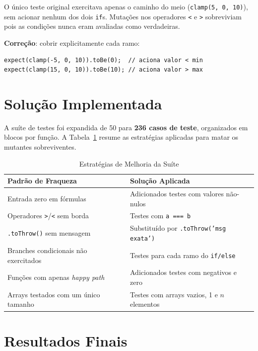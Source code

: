 \documentclass[conference]{IEEEtran}
\begin{document}
O único teste original exercitava apenas o caminho do meio (\texttt{clamp(5, 0, 10)}),
sem acionar nenhum dos dois \texttt{if}s. Mutações nos operadores \texttt{<} e
\texttt{>} sobreviviam pois as condições nunca eram avaliadas como verdadeiras.

\textbf{Correção}: cobrir explicitamente cada ramo:

\begin{lstlisting}[caption={Testes de ramo adicionados}]
expect(clamp(-5, 0, 10)).toBe(0);  // aciona valor < min
expect(clamp(15, 0, 10)).toBe(10); // aciona valor > max
\end{lstlisting}

\section{Solução Implementada}

A suíte de testes foi expandida de 50 para \textbf{236 casos de teste},
organizados em blocos por função. A Tabela~\ref{tab:estrategia} resume as
estratégias aplicadas para matar os mutantes sobreviventes.

\begin{table}[H]
\caption{Estratégias de Melhoria da Suíte}
\label{tab:estrategia}
\centering
\begin{tabularx}{\columnwidth}{lX}
\toprule
\textbf{Padrão de Fraqueza} & \textbf{Solução Aplicada} \\
\midrule
Entrada zero em fórmulas & Adicionados testes com valores não-nulos \\
Operadores \texttt{>}/\texttt{<} sem borda & Testes com \texttt{a === b} \\
\texttt{.toThrow()} sem mensagem & Substituído por \texttt{.toThrow('msg exata')} \\
Branches condicionais não exercitados & Testes para cada ramo do \texttt{if/else} \\
Funções com apenas \textit{happy path} & Adicionados testes com negativos e zero \\
Arrays testados com um único tamanho & Testes com arrays vazios, 1 e $n$ elementos \\
\bottomrule
\end{tabularx}
\end{table}

\section{Resultados Finais}
\end{document}
